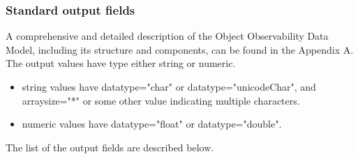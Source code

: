 \documentclass[11pt,a4paper]{ivoatex/ivoa}
\begin{document}
\subsubsection{Standard output fields}
A comprehensive and detailed description of the Object Observability Data Model, 
including its structure and components, can be found in the Appendix A.\\

The output values have type either string or numeric.
\begin{itemize}
  \item string values have datatype="char" or datatype="unicodeChar",
      and arraysize="*" or some other value indicating multiple characters.
  \item numeric values have datatype="float" or datatype="double".
\end{itemize}

The list of the output fields are described below.
\end{document}
